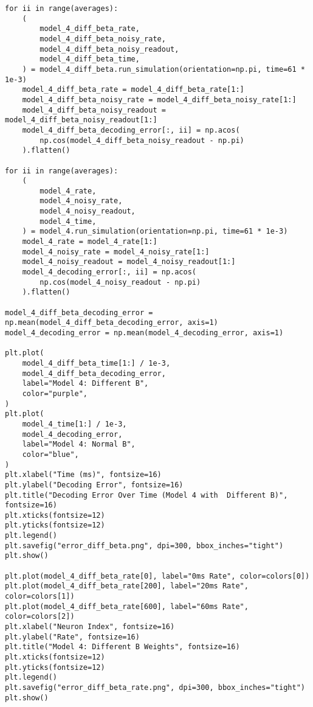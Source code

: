 \documentclass[a4paper, 11pt, oneside]{report}
\begin{document}
\begin{verbatim}
for ii in range(averages):
    (
        model_4_diff_beta_rate,
        model_4_diff_beta_noisy_rate,
        model_4_diff_beta_noisy_readout,
        model_4_diff_beta_time,
    ) = model_4_diff_beta.run_simulation(orientation=np.pi, time=61 * 1e-3)
    model_4_diff_beta_rate = model_4_diff_beta_rate[1:]
    model_4_diff_beta_noisy_rate = model_4_diff_beta_noisy_rate[1:]
    model_4_diff_beta_noisy_readout = model_4_diff_beta_noisy_readout[1:]
    model_4_diff_beta_decoding_error[:, ii] = np.acos(
        np.cos(model_4_diff_beta_noisy_readout - np.pi)
    ).flatten()

for ii in range(averages):
    (
        model_4_rate,
        model_4_noisy_rate,
        model_4_noisy_readout,
        model_4_time,
    ) = model_4.run_simulation(orientation=np.pi, time=61 * 1e-3)
    model_4_rate = model_4_rate[1:]
    model_4_noisy_rate = model_4_noisy_rate[1:]
    model_4_noisy_readout = model_4_noisy_readout[1:]
    model_4_decoding_error[:, ii] = np.acos(
        np.cos(model_4_noisy_readout - np.pi)
    ).flatten()

model_4_diff_beta_decoding_error = np.mean(model_4_diff_beta_decoding_error, axis=1)
model_4_decoding_error = np.mean(model_4_decoding_error, axis=1)

plt.plot(
    model_4_diff_beta_time[1:] / 1e-3,
    model_4_diff_beta_decoding_error,
    label="Model 4: Different B",
    color="purple",
)
plt.plot(
    model_4_time[1:] / 1e-3,
    model_4_decoding_error,
    label="Model 4: Normal B",
    color="blue",
)
plt.xlabel("Time (ms)", fontsize=16)
plt.ylabel("Decoding Error", fontsize=16)
plt.title("Decoding Error Over Time (Model 4 with  Different B)", fontsize=16)
plt.xticks(fontsize=12)
plt.yticks(fontsize=12)
plt.legend()
plt.savefig("error_diff_beta.png", dpi=300, bbox_inches="tight")
plt.show()

plt.plot(model_4_diff_beta_rate[0], label="0ms Rate", color=colors[0])
plt.plot(model_4_diff_beta_rate[200], label="20ms Rate", color=colors[1])
plt.plot(model_4_diff_beta_rate[600], label="60ms Rate", color=colors[2])
plt.xlabel("Neuron Index", fontsize=16)
plt.ylabel("Rate", fontsize=16)
plt.title("Model 4: Different B Weights", fontsize=16)
plt.xticks(fontsize=12)
plt.yticks(fontsize=12)
plt.legend()
plt.savefig("error_diff_beta_rate.png", dpi=300, bbox_inches="tight")
plt.show()

\end{verbatim}
\end{document}
